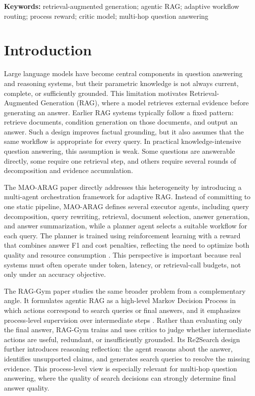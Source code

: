 \documentclass[12pt,a4paper]{article}
\begin{document}
\vspace{6pt}
\noindent\textbf{Keywords:} retrieval-augmented generation; agentic RAG; adaptive workflow routing; process reward; critic model; multi-hop question answering

\newpage

\section{Introduction}

Large language models have become central components in question answering and reasoning systems, but their parametric knowledge is not always current, complete, or sufficiently grounded. This limitation motivates Retrieval-Augmented Generation (RAG), where a model retrieves external evidence before generating an answer. Earlier RAG systems typically follow a fixed pattern: retrieve documents, condition generation on those documents, and output an answer. Such a design improves factual grounding, but it also assumes that the same workflow is appropriate for every query. In practical knowledge-intensive question answering, this assumption is weak. Some questions are answerable directly, some require one retrieval step, and others require several rounds of decomposition and evidence accumulation.

The MAO-ARAG paper directly addresses this heterogeneity by introducing a multi-agent orchestration framework for adaptive RAG. Instead of committing to one static pipeline, MAO-ARAG defines several executor agents, including query decomposition, query rewriting, retrieval, document selection, answer generation, and answer summarization, while a planner agent selects a suitable workflow for each query. The planner is trained using reinforcement learning with a reward that combines answer F1 and cost penalties, reflecting the need to optimize both quality and resource consumption \cite{chen2025maoarag}. This perspective is important because real systems must often operate under token, latency, or retrieval-call budgets, not only under an accuracy objective.

The RAG-Gym paper studies the same broader problem from a complementary angle. It formulates agentic RAG as a high-level Markov Decision Process in which actions correspond to search queries or final answers, and it emphasizes process-level supervision over intermediate steps \cite{xiong2025raggym}. Rather than evaluating only the final answer, RAG-Gym trains and uses critics to judge whether intermediate actions are useful, redundant, or insufficiently grounded. Its Re2Search design further introduces reasoning reflection: the agent reasons about the answer, identifies unsupported claims, and generates search queries to resolve the missing evidence. This process-level view is especially relevant for multi-hop question answering, where the quality of search decisions can strongly determine final answer quality.
\end{document}
